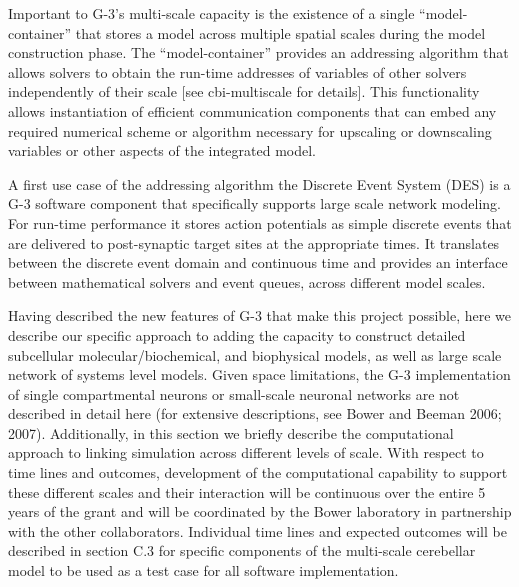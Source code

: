 \documentclass[12pt]{article}
\begin{document}
Important to G-3's multi-scale capacity is the existence of a single
``model-container'' that stores a model across multiple spatial scales
during the model construction phase.  The ``model-container'' provides
an addressing algorithm that allows solvers to obtain the run-time
addresses of variables of other solvers independently of their scale
[see cbi-multiscale for details].  This functionality allows
instantiation of efficient communication components that can embed any
required numerical scheme or algorithm necessary for upscaling or
downscaling variables or other aspects of the integrated model.

A first use case of the addressing algorithm the Discrete Event System
(DES) is a G-3 software component that specifically supports large
scale network modeling.  For run-time performance it stores action
potentials as simple discrete events that are delivered to
post-synaptic target sites at the appropriate times. It translates
between the discrete event domain and continuous time and provides an
interface between mathematical solvers and event queues, across
different model scales.

\noindent Having described the new features of G-3 that make this
project possible, here we describe our specific
approach to adding the capacity to construct detailed subcellular
molecular/biochemical, and biophysical models, as well as large scale
network of systems level models. Given
space limitations, the G-3 implementation of
single compartmental neurons or small-scale neuronal networks are not described in detail here (for extensive descriptions, see Bower and Beeman 2006; 2007). Additionally, in this section
we briefly describe the computational approach to linking simulation across
different levels of scale.  With respect to time lines and outcomes,
development of the computational capability to support these different scales 
and their interaction will be continuous over the
entire 5 years of the grant and will be coordinated by the Bower
laboratory in partnership with the other collaborators. Individual
time lines and expected outcomes will be described in section C.3 for
specific components of the multi-scale cerebellar model to be
used as a test case for all software implementation.
\end{document}
